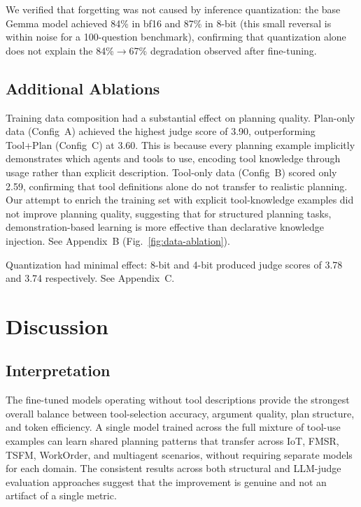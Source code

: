 \documentclass[conference]{IEEEtran}
\begin{document}
We verified that forgetting was not caused by inference quantization: the base Gemma model achieved 84\% in bf16 and 87\% in 8-bit (this small reversal is within noise for a 100-question benchmark), confirming that quantization alone does not explain the 84\%$\rightarrow$67\% degradation observed after fine-tuning.


\subsection{Additional Ablations}
\label{sec:ablation-highlights}

Training data composition had a substantial effect on planning quality. Plan-only data (Config~A) achieved the highest judge score of 3.90, outperforming Tool+Plan (Config~C) at 3.60. This is because every planning example implicitly demonstrates which agents and tools to use, encoding tool knowledge through usage rather than explicit description. Tool-only data (Config~B) scored only 2.59, confirming that tool definitions alone do not transfer to realistic planning. Our attempt to enrich the training set with explicit tool-knowledge examples did not improve planning quality, suggesting that for structured planning tasks, demonstration-based learning is more effective than declarative knowledge injection. See Appendix~B (Fig.~\ref{fig:data-ablation}).

Quantization had minimal effect: 8-bit and 4-bit produced judge scores of 3.78 and 3.74 respectively. See Appendix~C.


\section{Discussion}

\subsection{Interpretation}

The fine-tuned models operating without tool descriptions provide the strongest overall balance between tool-selection accuracy, argument quality, plan structure, and token efficiency. A single model trained across the full mixture of tool-use examples can learn shared planning patterns that transfer across IoT, FMSR, TSFM, WorkOrder, and multiagent scenarios, without requiring separate models for each domain. The consistent results across both structural and LLM-judge evaluation approaches suggest that the improvement is genuine and not an artifact of a single metric.
\end{document}
